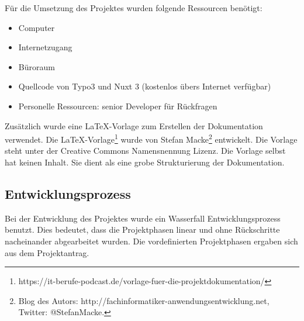 Für die Umsetzung des Projektes wurden folgende Ressourcen benötigt:
\begin{itemize}
	\item Computer
	\item Internetzugang
	\item Büroraum
	\item Quellcode von Typo3 und Nuxt 3 (kostenlos übers Internet verfügbar)
	\item Personelle Ressourcen: senior Developer für Rückfragen
\end{itemize}

Zusätzlich wurde eine LaTeX-Vorlage zum Erstellen der Dokumentation verwendet. Die LaTeX-Vorlage\footnote{\Vgl https://it-berufe-podcast.de/vorlage-fuer-die-projektdokumentation/} wurde von Stefan Macke\footnote{\Vgl Blog des Autors: http://fachinformatiker-anwendungsentwicklung.net, Twitter: @StefanMacke.} entwickelt. Die Vorlage steht unter der Creative Commons Namensnennung Lizenz. Die Vorlage selbst hat keinen Inhalt. Sie dient als eine grobe Strukturierung der Dokumentation.

\subsection{Entwicklungsprozess}
\label{sec:Entwicklungsprozess}

Bei der Entwicklung des Projektes wurde ein Wasserfall Entwicklungsprozess benutzt. Dies bedeutet, dass die Projektphasen linear und ohne Rückschritte nacheinander abgearbeitet wurden. Die vordefinierten Projektphasen ergaben sich aus dem Projektantrag.
